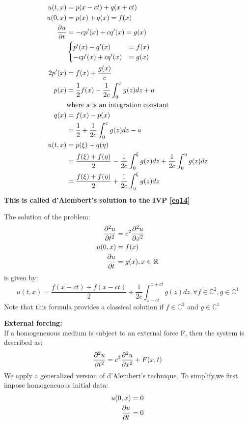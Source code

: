 \begin{align*}{}{}
u(t,x)&=p(x-ct)+q(x+ct)\\
u(0,x)&=p(x)+q(x)=f(x)\\
\pdv{u}{t}(0,x)&=-cp'(x)+cq'(x)=g(x)\\
&\begin{cases}
    p'(x)+q'(x)&=f(x)\\
    -cp'(x)+cq'(x)&=g(x)
\end{cases}\\
2p'(x)&=f(x)+\frac{g(x)}{c}\\
p(x)&=\frac{1}{2}f(x)-\frac{1}{2c}\int_{0}^{x}g(z)dz+a\\
&\text{where a is an integration constant}\\
q(x)&=f(x)-p(x)\\
&=\frac{1}{2}+\frac{1}{2c}\int_{0}^{x}g(z)dz-a\\
u(t,x)&=p(\xi)+q(\eta)\\
&=\frac{f(\xi)+f(\eta)}{2}-\frac{1}{2c}\int_{0}^{\xi}g(z)dz+\frac{1}{2c}\int_{0}^{\eta}g(z)dz\\
&=\frac{f(\xi)+f(\eta)}{2}+\frac{1}{2c}\int_{\eta}^{\xi}g(z)dz
\end{align*}
\textbf{This is called d'Alembert's solution to the IVP \eqref{eq14}}
\begin{theorem}{}
The solution of the problem:
\begin{align*}{}{}
\pdv[2]{u}{t}&=c^2\pdv[2]{u}{x}\\
u(0,x)&=f(x)\\
\pdv{u}{t}(0,x)&=g(x),x\in \mathbb{R}
\end{align*}
is given by:
$$
    u(t,x)=\frac{f(x+ct)+f(x-ct)}{2}+\frac{1}{2c}\int_{x-ct}^{x+ct}g(z)dz, \forall f\in \mathbb{C}^2, g\in \mathbb{C}^1
$$ 
Note that this formula provides a classical solution if $ f\in \mathbb{C}^2 $ and $ g\in \mathbb{C}^1 $ 
\end{theorem}
\textbf{External forcing:}
\\If a homogeneuous medium is subject to an external force F, then the system is described as:
\begin{equation}
   \label{eq17} \pdv[2]{u}{t}=c^2\pdv[2]{u}{x}+F(x,t)
\end{equation}
We apply a generalized version of d'Alembert's technique. To simplify,we first impose homogeneuous initial data:
\begin{align*}{}{}
u(0,x)&=0\\
\pdv{u}{t}(0,x)&=0\\
\end{align*}
